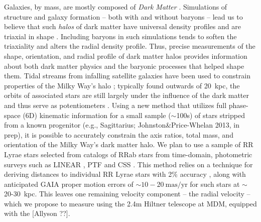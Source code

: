 \documentclass[preprint]{aastex}
\begin{document}
Galaxies, by mass, are mostly composed of \emph{Dark Matter}
\citep{}. Simulations of structure and galaxy formation -- both with
and without baryons -- lead us to believe that such \emph{halos} of
dark matter have universal density profiles \citep{} and are triaxial
in shape \citep{}. Including baryons in such simulations tends to
soften the triaxiality and alters the radial density profile. Thus,
precise measurements of the shape, orientation, and radial profile of
dark matter halos provides information about both dark matter physics
and the baryonic processes that helped shape them. Tidal streams from
infalling satellite galaxies have been used to constrain properties of
the Milky Way's halo \citep{}; typically found outwards of 20~kpc, the
orbits of associated stars are still largely under the influence of
the dark matter and thus serve as potentiometers \citep{}. Using a new
method that utilizes full phase-space (6D) kinematic information for a
small sample ($\sim$100s) of stars stripped from a known progenitor
(e.g., Sagittarius; Johnston\&Price-Whelan 2013, in prep), it is
possible to accurately constrain the axis ratios, total mass, and
orientation of the Milky Way's dark matter halo. We plan to use a
sample of RR Lyrae stars selected from catalogs of RRab stars from
time-domain, photometric surveys such as LINEAR \citep{}, PTF \citep{}
and CSS \citep{}. This method relies on a technique for deriving
distances to individual RR Lyrae stars with 2\% accuracy \citep{},
along with anticipated GAIA proper motion errors of
$\sim10-20~\mathrm{mas}/\mathrm{yr}$ for such stars at $\sim$
20-30~kpc. This leaves one remaining velocity component -- the radial
velocity -- which we propose to measure using the 2.4m Hiltner
telescope at MDM, equipped with the [Allyson ??].
\end{document}
